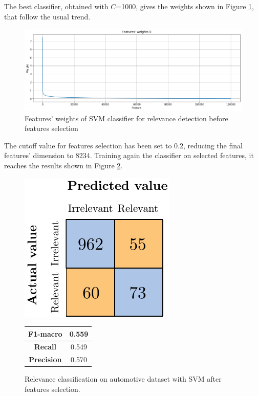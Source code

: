 The best classifier, obtained with $C$=1000, gives the weights shown in Figure \ref{fig:ita_rel_svm_fs}, that follow the usual trend.

\begin{figure}[H]
	\centering
	\includegraphics[width=\textwidth]{figures/conf_matrices/ita_rel_svm/ita_rel_svm_fs.png}
	\caption{Features' weights of SVM classifier for relevance detection before features selection}
	\label{fig:ita_rel_svm_fs}
\end{figure}

The cutoff value for features selection has been set to 0.2, reducing the final features' dimension to 8234. Training again the classifier on selected features, it reaches the results shown in Figure \ref{fig:ita_rel_svm_afs}.


\begin{figure}[H]
	\begin{minipage}[b]{0.6\linewidth}
		\centering
	\includegraphics[scale=1]{figures/conf_matrices/ita_rel_svm/ita_rel_svm_afs.pdf}
	\end{minipage}
	\begin{minipage}[b]{0.3\linewidth}
		\begin{tabular}[b]{ | c | c | } 
			\hline
			\textbf{F1-macro} & 0.559 \\
			\hline
			\textbf{Recall} & 0.549 \\ 
			\hline
			\textbf{Precision} & 0.570 \\ 
			\hline
		\end{tabular}
	\end{minipage}
	\caption{Relevance classification on automotive dataset with SVM after features selection.}
	\label{fig:ita_rel_svm_afs}
\end{figure}



